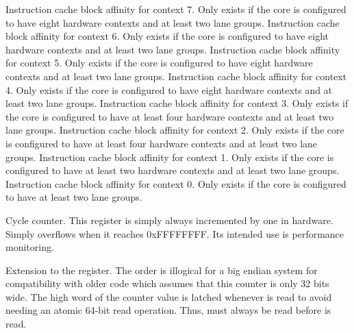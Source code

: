 Instruction cache block affinity for context 7. Only exists if the core is
configured to have eight hardware contexts and at least two lane groups.
Instruction cache block affinity for context 6. Only exists if the core is
configured to have eight hardware contexts and at least two lane groups.
Instruction cache block affinity for context 5. Only exists if the core is
configured to have eight hardware contexts and at least two lane groups.
Instruction cache block affinity for context 4. Only exists if the core is
configured to have eight hardware contexts and at least two lane groups.
Instruction cache block affinity for context 3. Only exists if the core is
configured to have at least four hardware contexts and at least two lane groups.
Instruction cache block affinity for context 2. Only exists if the core is
configured to have at least four hardware contexts and at least two lane groups.
Instruction cache block affinity for context 1. Only exists if the core is
configured to have at least two hardware contexts and at least two lane groups.
Instruction cache block affinity for context 0. Only exists if the core is
configured to have at least two lane groups.


Cycle counter. This register is simply always incremented by one in hardware.
Simply overflows when it reaches 0xFFFFFFFF. Its intended use is performance
monitoring.



Extension to the  register. The order is illogical for a big endian 
system for compatibility with older code which assumes that this counter is only 
32 bits wide. The high word of the counter value is latched whenever  
is read to avoid needing an atomic 64-bit read operation. Thus,  must 
always be read before  is read.



